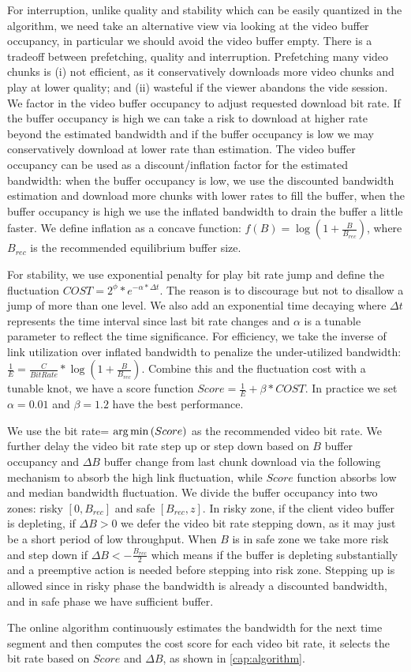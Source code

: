 
For interruption, unlike quality and stability which can be easily quantized in the algorithm, we need take an alternative view via looking at the video buffer occupancy, in particular we should avoid the video buffer empty. There is a tradeoff between prefetching, quality and interruption. Prefetching many video chunks is (i) not efficient, as it conservatively downloads more video chunks and play at lower quality; and (ii) wasteful if the viewer abandons the vide session. We factor in the video buffer occupancy to adjust requested download bit rate. If the buffer occupancy is high we can take a risk to download at higher rate beyond the estimated bandwidth and if the buffer occupancy is low we may conservatively download at lower rate than estimation. The video buffer occupancy can be used as a discount/inflation factor for the estimated bandwidth: when the buffer occupancy is low, we use the discounted bandwidth estimation and download more chunks with lower rates to fill the buffer, when the buffer occupancy is high we use the inflated bandwidth to drain the buffer a little faster. We define inflation as a concave function: $f(B)= \log(1+\frac{B}{B_{rec}})$, where $B_{rec}$ is the recommended equilibrium buffer size.  

For stability, we use exponential penalty for play bit rate jump and define the fluctuation $COST = 2^{\phi} *e^{-\alpha *\Delta t}$. The reason is to discourage but not to disallow a jump of more than one level. We also add an exponential time decaying where $\Delta t$ represents the time interval since last bit rate changes and $\alpha$ is a tunable parameter to reflect the time significance. For efficiency, we take the inverse of link utilization over inflated bandwidth to penalize the under-utilized bandwidth: $\frac{1}{E} = \frac{C}{BitRate}*\log(1+\frac{B}{B_{rec}}) $. Combine this and the fluctuation cost with a tunable knot, we have a score function $Score= \frac{1}{E} + \beta*COST$. In practice we set $\alpha=0.01$ and $\beta=1.2$ have the best performance.


We use the bit rate= $\operatorname*{arg\,min}{(Score)}$ as the recommended video bit rate. We further delay the video bit rate step up or step down based on $B$ buffer occupancy and $\Delta B$ buffer change from last chunk download via the following mechanism to absorb the high link fluctuation, while $Score$ function absorbs low and median bandwidth fluctuation. We divide the buffer occupancy into two zones: risky $[0,B_{rec}]$ and safe $[B_{rec},z]$. In risky zone, if the client video buffer is depleting, if $\Delta B>0$ we defer the video bit rate stepping down, as it may just be a short period of low throughput. When $B$ is in safe zone we take more risk and step down if $\Delta B < -\frac{B_{rec}}{2}$ which means if the buffer is depleting substantially and a preemptive action is needed before stepping into risk zone. Stepping up is allowed since in risky phase the bandwidth is already a discounted bandwidth, and in safe phase we have sufficient buffer. 
  
The online algorithm continuously estimates the bandwidth for the next time segment and then computes the cost score for each video bit rate, it selects the bit rate based on $Score$ and $\Delta B$, as shown in \autoref{cap:algorithm}. 
